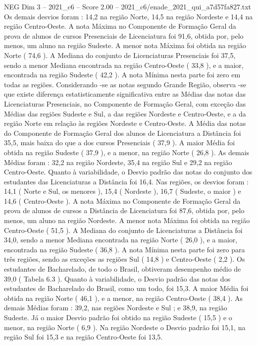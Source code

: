 \begin{textsample}{NEG Dim 3 – 2021\_c6 – Score 2.00 – 2021\_c6/enade\_2021\_qui\_a7d57fa827.txt}
Os demais desvios foram : 14,2 na região Norte, 14,5 na região Nordeste e 14,4 na região Centro-Oeste.
A nota Máxima no Componente de Formação Geral da prova de alunos de cursos Presenciais de Licenciatura foi 91,6, obtida por, pelo menos, um aluno na região Sudeste.
A menor nota Máxima foi obtida na região Norte ( 74,6 ).
A Mediana do conjunto de Licenciaturas Presenciais foi 37,5, sendo a menor Mediana encontrada na região Centro-Oeste ( 33,8 ), e a maior, encontrada na região Sudeste ( 42,2 ).
A nota Mínima nesta parte foi zero em todas as regiões.
Considerando -se as notas segundo Grande Região, observa -se que existe diferença estatisticamente significativa entre as Médias das notas das Licenciaturas Presenciais, no Componente de Formação Geral, com exceção das Médias das regiões Sudeste e Sul, a das regiões Nordeste e Centro-Oeste, e a da região Norte em relação às regiões Nordeste e Centro-Oeste.
A Média das notas do Componente de Formação Geral dos alunos de Licenciatura a Distância foi 35,5, mais baixa do que a dos cursos Presenciais ( 37,9 ).
A maior Média foi obtida na região Sudeste ( 37,9 ), e a menor, na região Norte ( 26,8 ).
As demais Médias foram : 32,2 na região Nordeste, 35,4 na região Sul e 29,2 na região Centro-Oeste.
Quanto à variabilidade, o Desvio padrão das notas do conjunto dos estudantes das Licenciaturas a Distância foi 16,4.
Nas regiões, os desvios foram : 14,1 ( Norte e Sul, os menores ), 15,4 ( Nordeste ), 16,7 ( Sudeste, o maior ) e 14,6 ( Centro-Oeste ).
A nota Máxima no Componente de Formação Geral da prova de alunos de cursos a Distância de Licenciatura foi 87,6, obtida por, pelo menos, um aluno na região Nordeste.
A menor nota Máxima foi obtida na região Centro-Oeste ( 51,5 ).
A Mediana do conjunto de Licenciaturas a Distância foi 34,0, sendo a menor Mediana encontrada na região Norte ( 26,0 ), e a maior, encontrada na região Sudeste ( 36,8 ).
A nota Mínima nesta parte foi zero para três regiões, sendo as exceções as regiões Sul ( 14,8 ) e Centro-Oeste ( 2,2 ).
Os estudantes de Bacharelado, de todo o Brasil, obtiveram desempenho médio de 39,0 ( Tabela 6.3 ).
Quanto à variabilidade, o Desvio padrão das notas dos estudantes de Bacharelado do Brasil, como um todo, foi 15,3.
A maior Média foi obtida na região Norte ( 46,1 ), e a menor, na região Centro-Oeste ( 38,4 ).
As demais Médias foram : 39,2, nas regiões Nordeste e Sul ; e 38,9, na região Sudeste.
Já o maior Desvio padrão foi obtido na região Sudeste ( 15,5 ) e o menor, na região Norte ( 6,9 ).
Na região Nordeste o Desvio padrão foi 15,1, na região Sul foi 15,3 e na região Centro-Oeste foi 13,5.

\end{textsample}
